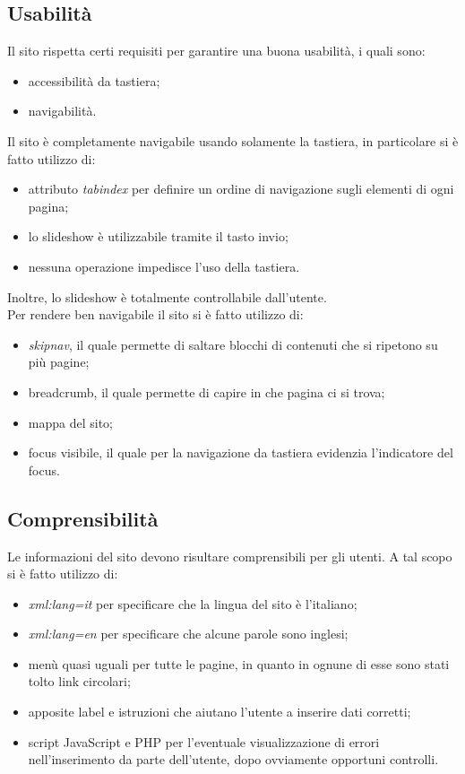 	\subsection{Usabilità}
	Il sito rispetta certi requisiti per garantire una buona usabilità, i quali sono:
	\begin{itemize}
		\item accessibilità da tastiera;
		\item navigabilità.
	\end{itemize}
	Il sito è completamente navigabile usando solamente la tastiera, in particolare si è fatto utilizzo di:
	\begin{itemize}
		\item attributo \textit{tabindex} per definire un ordine di navigazione sugli elementi di ogni pagina;
		\item lo slideshow è utilizzabile tramite il tasto invio;
		\item nessuna operazione impedisce l'uso della tastiera. 
	\end{itemize}
	Inoltre, lo slideshow è totalmente controllabile dall'utente.\\
	Per rendere ben navigabile il sito si è fatto utilizzo di:
	\begin{itemize}
		\item \textit{skipnav}, il quale permette di saltare blocchi di contenuti che si ripetono su più pagine;
		\item breadcrumb, il quale permette di capire in che pagina ci si trova;
		\item mappa del sito;
		\item focus visibile, il quale per la navigazione da tastiera evidenzia l'indicatore del focus.
	\end{itemize}
	\subsection{Comprensibilità}
	Le informazioni del sito devono risultare comprensibili per gli utenti. A tal scopo si è fatto utilizzo di:
	\begin{itemize}
		\item \textit{xml:lang=it} per specificare che la lingua del sito è l'italiano;
		\item \textit{xml:lang=en} per specificare che alcune parole sono inglesi;
		\item menù quasi uguali per tutte le pagine, in quanto in ognune di esse sono stati tolto link circolari;
		\item apposite label e istruzioni che aiutano l'utente a inserire dati corretti; 
		\item script JavaScript e PHP per l'eventuale visualizzazione di errori nell'inserimento da parte dell'utente, dopo ovviamente opportuni controlli.
	\end{itemize}
